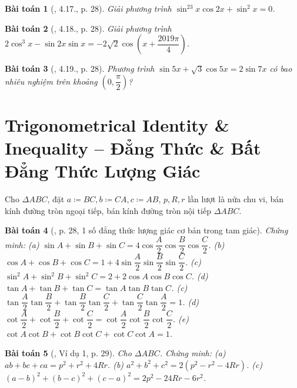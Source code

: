 \documentclass{article}
\newtheorem{baitoan}{Bài toán}
\begin{document}
\begin{baitoan}[\cite{Hung_nang_cao_phat_trien_Toan_11_tap_1}, 4.17., p. 28]
	Giải phương trình $\sin^23x\cos2x + \sin^2x = 0$.
\end{baitoan}

\begin{baitoan}[\cite{Hung_nang_cao_phat_trien_Toan_11_tap_1}, 4.18., p. 28]
	Giải phương trình $2\cos^3x - \sin2x\sin x = -2\sqrt{2}\cos\left(x + \dfrac{2019\pi}{4}\right)$.
\end{baitoan}

\begin{baitoan}[\cite{Hung_nang_cao_phat_trien_Toan_11_tap_1}, 4.19., p. 28]
	Phương trình $\sin5x + \sqrt{3}\cos5x = 2\sin7x$ có bao nhiêu nghiệm trên khoảng $\left(0,\dfrac{\pi}{2}\right)$?
\end{baitoan}


\section{Trigonometrical Identity \& Inequality -- Đẳng Thức \& Bất Đẳng Thức Lượng Giác}
Cho $\Delta ABC$, đặt $a\coloneqq BC, b\coloneqq CA, c\coloneqq AB$, $p,R,r$ lần lượt là nửa chu vi, bán kính đường tròn ngoại tiếp, bán kính đường tròn nội tiếp $\Delta ABC$.

\begin{baitoan}[\cite{Hung_nang_cao_phat_trien_Toan_11_tap_1}, p. 28, 1 số đẳng thức lượng giác cơ bản trong tam giác]
	Chứng minh: (a) $\sin A + \sin B + \sin C = 4\cos\dfrac{A}{2}\cos\dfrac{B}{2}\cos\dfrac{C}{2}$. (b) $\cos A + \cos B + \cos C = 1 + 4\sin\dfrac{A}{2}\sin\dfrac{B}{2}\sin\dfrac{C}{2}$. (c) $\sin^2A + \sin^2B + \sin^2C = 2 + 2\cos A\cos B\cos C$. (d) $\tan A + \tan B + \tan C = \tan A\tan B\tan C$. (c) $\tan\dfrac{A}{2}\tan\dfrac{B}{2} + \tan\dfrac{B}{2}\tan\dfrac{C}{2} + \tan\dfrac{C}{2}\tan\dfrac{A}{2} = 1$. (d) $\cot\dfrac{A}{2} + \cot\dfrac{B}{2} + \cot\dfrac{C}{2} = \cot\dfrac{A}{2}\cot\dfrac{B}{2}\cot\dfrac{C}{2}$. (e) $\cot A\cot B + \cot B\cot C + \cot C\cot A = 1$.
\end{baitoan}

\begin{baitoan}[\cite{Hung_nang_cao_phat_trien_Toan_11_tap_1}, Ví dụ 1, p. 29]
	Cho $\Delta ABC$. Chứng minh: (a) $ab + bc + ca = p^2 + r^2 + 4Rr$. (b) $a^2 + b^2 + c^2 = 2(p^2 - r^2 - 4Rr)$. (c) $(a - b)^2 + (b - c)^2 + (c - a)^2 = 2p^2 - 24Rr - 6r^2$.
\end{baitoan}
\end{document}
